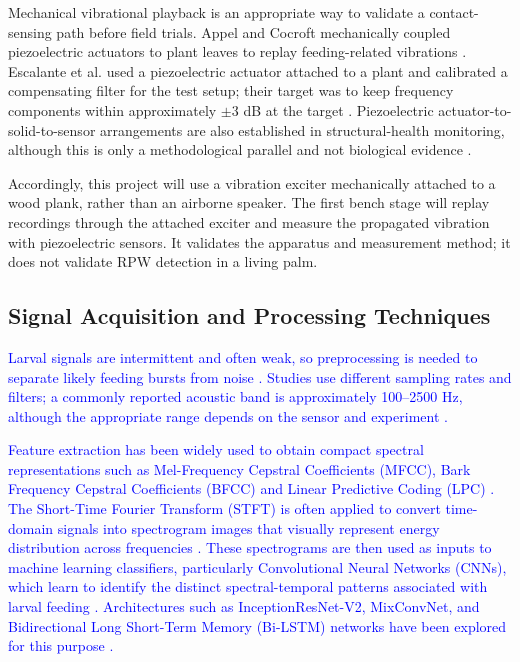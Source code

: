 \documentclass[12pt,a4paper,oneside]{memoir}
\newcommand{\earlierrevision}[1]{\textcolor{blue}{#1}}
\newcommand{\newrevision}[1]{\textcolor{green!45!black}{#1}}
\begin{document}
\newrevision{Mechanical vibrational playback is an appropriate way to validate a contact-sensing path before field trials. Appel and Cocroft mechanically coupled piezoelectric actuators to plant leaves to replay feeding-related vibrations \cite{appel2014}. Escalante et al. used a piezoelectric actuator attached to a plant and calibrated a compensating filter for the test setup; their target was to keep frequency components within approximately $\pm3$ dB at the target \cite{escalante2024}. Piezoelectric actuator-to-solid-to-sensor arrangements are also established in structural-health monitoring, although this is only a methodological parallel and not biological evidence \cite{agis2020}.}

\newrevision{Accordingly, this project will use a vibration exciter mechanically attached to a wood plank, rather than an airborne speaker. The first bench stage will replay recordings through the attached exciter and measure the propagated vibration with piezoelectric sensors. It validates the apparatus and measurement method; it does not validate RPW detection in a living palm.}

\subsection{Signal Acquisition and Processing Techniques}

\earlierrevision{Larval signals are intermittent and often weak, so preprocessing is needed to separate likely feeding bursts from noise \cite{karar2021,saranya2025}. Studies use different sampling rates and filters; a commonly reported acoustic band is approximately 100--2500 Hz, although the appropriate range depends on the sensor and experiment \cite{karar2022,pinhas2008,saranya2025}.}

\earlierrevision{Feature extraction has been widely used to obtain compact spectral representations such as Mel-Frequency Cepstral Coefficients (MFCC), Bark Frequency Cepstral Coefficients (BFCC) and Linear Predictive Coding (LPC) \cite{saleem2022,saranya2025}. The Short-Time Fourier Transform (STFT) is often applied to convert time-domain signals into spectrogram images that visually represent energy distribution across frequencies \cite{karar2022,saranya2025}. These spectrograms are then used as inputs to machine learning classifiers, particularly Convolutional Neural Networks (CNNs), which learn to identify the distinct spectral-temporal patterns associated with larval feeding \cite{karar2022,saranya2025}. Architectures such as InceptionResNet-V2, MixConvNet, and Bidirectional Long Short-Term Memory (Bi-LSTM) networks have been explored for this purpose \cite{karar2021,karar2022,saranya2025}.}
\end{document}
